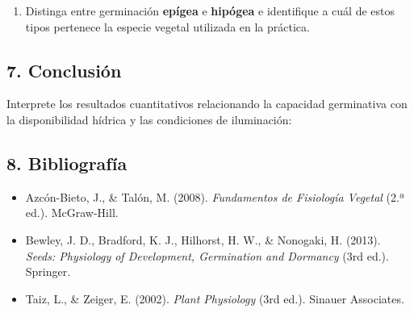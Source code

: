 \documentclass[
  spanish,
  10pt,
  letterpaper,
  twocolumn]{article}
\providecommand{\tightlist}{%
  \setlength{\itemsep}{0pt}\setlength{\parskip}{0pt}}
\begin{document}
\hrulefill

\hrulefill

\hrulefill

\begin{enumerate}
\def\labelenumi{\arabic{enumi}.}
\setcounter{enumi}{2}
\tightlist
\item
  Distinga entre germinación \textbf{epígea} e \textbf{hipógea} e
  identifique a cuál de estos tipos pertenece la especie vegetal
  utilizada en la práctica.
\end{enumerate}

\hrulefill

\hrulefill

\hrulefill

\hrulefill

\hrulefill

\hrulefill

\hrulefill

\hrulefill

\hrulefill

\hrulefill

\hrulefill

\subsection{7. Conclusión}\label{conclusiuxf3n}

Interprete los resultados cuantitativos relacionando la capacidad
germinativa con la disponibilidad hídrica y las condiciones de
iluminación:

\hrulefill

\hrulefill

\hrulefill

\hrulefill

\hrulefill

\hrulefill

\hrulefill

\hrulefill

\hrulefill

\subsection{8. Bibliografía}\label{bibliografuxeda}

\begin{itemize}
\tightlist
\item
  Azcón-Bieto, J., \& Talón, M. (2008). \emph{Fundamentos de Fisiología
  Vegetal} (2.ª ed.). McGraw-Hill.
\item
  Bewley, J. D., Bradford, K. J., Hilhorst, H. W., \& Nonogaki, H.
  (2013). \emph{Seeds: Physiology of Development, Germination and
  Dormancy} (3rd ed.). Springer.
\item
  Taiz, L., \& Zeiger, E. (2002). \emph{Plant Physiology} (3rd ed.).
  Sinauer Associates.
\end{itemize}
\end{document}
